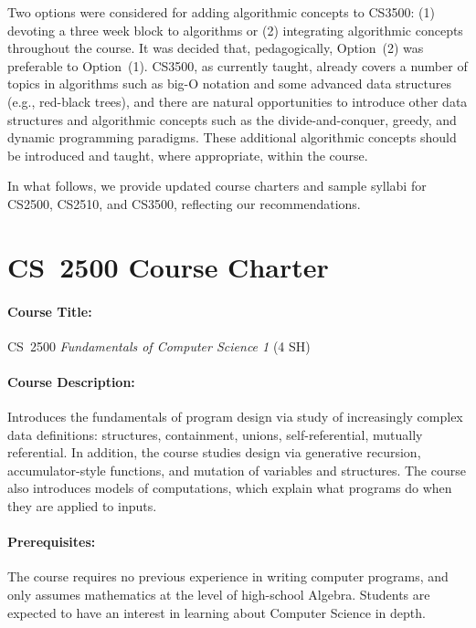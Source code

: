 \documentclass[11pt]{article}
\begin{document}
Two options were considered for adding algorithmic concepts to CS3500: (1) devoting a three week block to algorithms or (2) integrating algorithmic concepts throughout the course.  It was decided that, pedagogically, Option~(2) was preferable to Option~(1).  CS3500, as currently taught, already covers a number of topics in algorithms such as big-O notation and some advanced data structures (e.g., red-black trees), and there are natural opportunities to introduce other data structures and algorithmic concepts such as the divide-and-conquer, greedy, and dynamic programming paradigms.  These additional algorithmic concepts should be introduced and taught, where appropriate, within the course.

In what follows, we provide updated course charters and sample syllabi for CS2500, CS2510, and CS3500, reflecting our recommendations.


\pagebreak

\section*{CS~2500 Course Charter}

\paragraph{Course Title:}
%
CS~2500 \emph{Fundamentals of Computer Science 1} (4 SH)

\paragraph{Course Description:}
%
Introduces the fundamentals of program design via study of increasingly
complex data definitions: structures, containment, unions, self-referential,
mutually referential. In addition, the course studies design via generative
recursion, accumulator-style functions, and mutation of variables and
structures. The course also introduces models of computations, which explain
what programs do when they are applied to inputs.

\paragraph{Prerequisites:}
%
The course requires no previous experience in writing computer programs, and
only assumes mathematics at the level of high-school Algebra. Students are
expected to have an interest in learning about Computer Science in depth.
\end{document}
